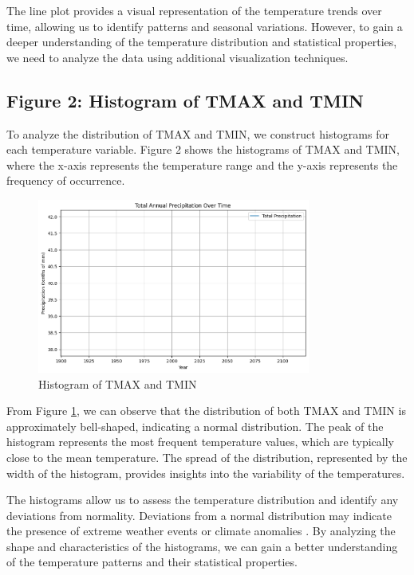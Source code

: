 \documentclass{article}
\begin{document}
The line plot provides a visual representation of the temperature trends over time, allowing us to identify patterns and seasonal variations. However, to gain a deeper understanding of the temperature distribution and statistical properties, we need to analyze the data using additional visualization techniques.

\subsection{Figure 2: Histogram of TMAX and TMIN}

To analyze the distribution of TMAX and TMIN, we construct histograms for each temperature variable. Figure 2 shows the histograms of TMAX and TMIN, where the x-axis represents the temperature range and the y-axis represents the frequency of occurrence.

\begin{figure}[h]
  \centering
  \includegraphics[width=0.8\textwidth]{figure_1.png}
  \caption{Histogram of TMAX and TMIN}
  \label{fig:temp_histogram}
\end{figure}

From Figure \ref{fig:temp_histogram}, we can observe that the distribution of both TMAX and TMIN is approximately bell-shaped, indicating a normal distribution. The peak of the histogram represents the most frequent temperature values, which are typically close to the mean temperature. The spread of the distribution, represented by the width of the histogram, provides insights into the variability of the temperatures.

The histograms allow us to assess the temperature distribution and identify any deviations from normality. Deviations from a normal distribution may indicate the presence of extreme weather events or climate anomalies \cite{wilks2011statistical}. By analyzing the shape and characteristics of the histograms, we can gain a better understanding of the temperature patterns and their statistical properties.
\end{document}
